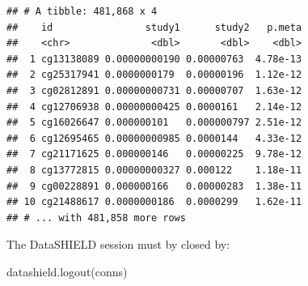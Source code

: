 \documentclass[
]{book}
\newenvironment{Shaded}{\begin{snugshade}}{\end{snugshade}}
\newcommand{\FunctionTok}[1]{\textcolor[rgb]{0.00,0.00,0.00}{#1}}
\newcommand{\NormalTok}[1]{#1}
\begin{document}
\begin{verbatim}
## # A tibble: 481,868 x 4
##    id                study1      study2   p.meta
##    <chr>              <dbl>       <dbl>    <dbl>
##  1 cg13138089 0.00000000190 0.00000763  4.78e-13
##  2 cg25317941 0.0000000179  0.00000196  1.12e-12
##  3 cg02812891 0.00000000731 0.00000707  1.63e-12
##  4 cg12706938 0.00000000425 0.0000161   2.14e-12
##  5 cg16026647 0.000000101   0.000000797 2.51e-12
##  6 cg12695465 0.00000000985 0.0000144   4.33e-12
##  7 cg21171625 0.000000146   0.00000225  9.78e-12
##  8 cg13772815 0.00000000327 0.000122    1.18e-11
##  9 cg00228891 0.000000166   0.00000283  1.38e-11
## 10 cg21488617 0.0000000186  0.0000299   1.62e-11
## # ... with 481,858 more rows
\end{verbatim}

The DataSHIELD session must by closed by:

\begin{Shaded}
\begin{Highlighting}[]
\FunctionTok{datashield.logout}\NormalTok{(conns)}
\end{Highlighting}
\end{Shaded}


  
\end{document}
